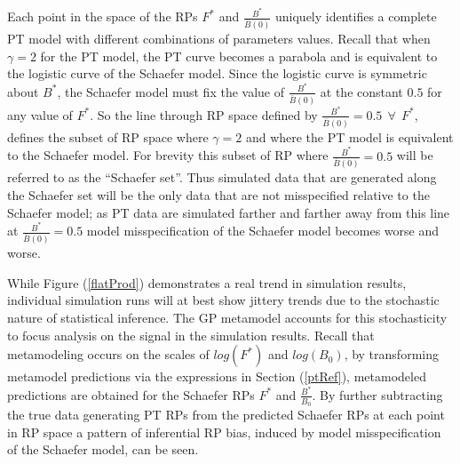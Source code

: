 %
Each point in the space of the RPs $F^*$ and $\frac{B^*}{\bar B(0)}$ uniquely
identifies a complete PT model with different combinations of parameters values.
Recall that when $\gamma=2$ for the PT model, the PT curve becomes a parabola
and is equivalent to the logistic curve of the Schaefer model. Since the
logistic curve is symmetric about $B^*$, the Schaefer model must fix the value of
$\frac{B^*}{\bar B(0)}$ at the constant $0.5$ for any value of $F^*$. So
the line through RP space defined by $\frac{B^*}{\bar B(0)}=0.5 ~~ \forall ~~ F^*$,
defines the subset of RP space where $\gamma=2$ and where the PT model is
equivalent to the Schaefer model. For brevity this subset of RP where $\frac{B^*}{\bar B(0)}=0.5$
will be referred to as the ``Schaefer set''. Thus simulated data that are
generated along the Schaefer set will be the only data that are not
misspecified relative to the Schaefer model; as PT data are simulated
farther and farther away from this line at $\frac{B^*}{\bar B(0)}=0.5$ model
misspecification of the Schaefer model becomes worse and worse.


%
While Figure (\ref{flatProd}) demonstrates a real trend in simulation results,
individual simulation runs will at best show jittery trends due to the stochastic
nature of statistical inference. The GP metamodel accounts for this
stochasticity %
to focus analysis on the signal in the simulation results. Recall that metamodeling
occurs on the scales of $log(F^*)$ and $log(B_0)$,
by transforming metamodel predictions via the expressions in Section (\ref{ptRef}), %
metamodeled predictions are obtained for the Schaefer RPs $F^*$ and $\frac{B^*}{B_0}$. 
By further subtracting the true data generating PT RPs from the predicted Schaefer RPs 
at each point in RP space a pattern of inferential RP bias, induced by model 
misspecification of the Schaefer model, can be seen. %

%

